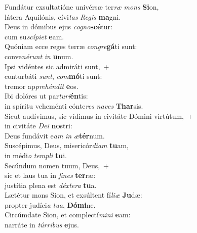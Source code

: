 \evenverse Fundátur exsultatióne univérsæ ter\textit{ræ} \textit{mons} \textbf{Si}on,~\*\\
\evenverse látera Aquilónis, cívi\textit{tas} \textit{Re}\textit{gis} \textbf{ma}gni.\\
\oddverse Deus in dómibus ejus \textit{co}\textit{gno}\textbf{scé}tur:~\*\\
\oddverse cum su\textit{scí}\textit{pi}\textit{et} \textbf{e}am.\\
\evenverse Quóniam ecce reges terræ \textit{con}\textit{gre}\textbf{gá}ti sunt:~\*\\
\evenverse conve\textit{né}\textit{runt} \textit{in} \textbf{u}num.\\
\oddverse Ipsi vidéntes sic admiráti sunt,~+\\
\oddverse  conturbáti \textit{sunt}, \textit{com}\textbf{mó}ti sunt:~\*\\
\oddverse tremor ap\textit{pre}\textit{hén}\textit{dit} \textbf{e}os.\\
\evenverse Ibi dolóres ut par\textit{tu}\textit{ri}\textbf{én}tis:~\*\\
\evenverse in spíritu veheménti cónte\textit{res} \textit{na}\textit{ves} \textbf{Thar}sis.\\
\oddverse Sicut audívimus, sic vídimus in civitáte Dómini virtútum,~+\\
\oddverse  in civitáte \textit{De}\textit{i} \textbf{no}stri:~\*\\
\oddverse Deus fundávit e\textit{am} \textit{in} \textit{æ}\textbf{tér}num.\\
\evenverse Suscépimus, Deus, misericór\textit{di}\textit{am} \textbf{tu}am,~\*\\
\evenverse in médi\textit{o} \textit{tem}\textit{pli} \textbf{tu}i.\\
\oddverse Secúndum nomen tuum, Deus,~+\\
\oddverse  sic et laus tua in \textit{fi}\textit{nes} \textbf{ter}ræ:~\*\\
\oddverse justítia plena est \textit{déx}\textit{te}\textit{ra} \textbf{tu}a.\\
\evenverse Lætétur mons Sion, et exsúltent fí\textit{li}\textit{æ} \textbf{Ju}dæ:~\*\\
\evenverse propter judíci\textit{a} \textit{tu}\textit{a}, \textbf{Dó}\textbf{mi}ne.\\
\oddverse Circúmdate Sion, et complectí\textit{mi}\textit{ni} \textbf{e}am:~\*\\
\oddverse narráte in \textit{túr}\textit{ri}\textit{bus} \textbf{e}jus.\\
